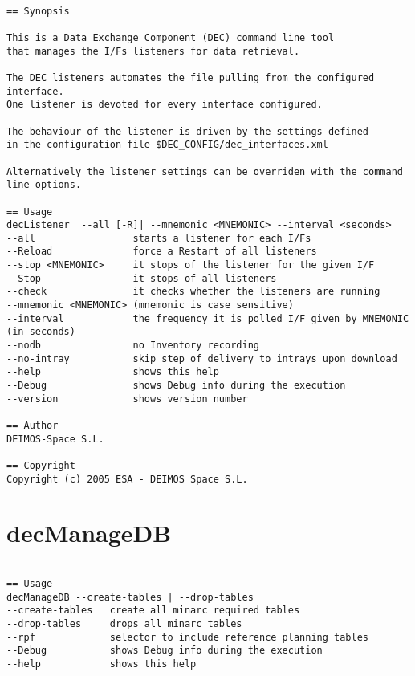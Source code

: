 \documentclass[dec_sum_main.tex]{subfiles}
\begin{document}
\begin{verbatim}

== Synopsis

This is a Data Exchange Component (DEC) command line tool 
that manages the I/Fs listeners for data retrieval.

The DEC listeners automates the file pulling from the configured interface.
One listener is devoted for every interface configured.

The behaviour of the listener is driven by the settings defined
in the configuration file $DEC_CONFIG/dec_interfaces.xml

Alternatively the listener settings can be overriden with the command line options.

== Usage
decListener  --all [-R]| --mnemonic <MNEMONIC> --interval <seconds>
--all                 starts a listener for each I/Fs
--Reload              force a Restart of all listeners
--stop <MNEMONIC>     it stops of the listener for the given I/F
--Stop                it stops of all listeners
--check               it checks whether the listeners are running
--mnemonic <MNEMONIC> (mnemonic is case sensitive)
--interval            the frequency it is polled I/F given by MNEMONIC (in seconds)
--nodb                no Inventory recording
--no-intray           skip step of delivery to intrays upon download
--help                shows this help
--Debug               shows Debug info during the execution
--version             shows version number      

== Author
DEIMOS-Space S.L.

== Copyright
Copyright (c) 2005 ESA - DEIMOS Space S.L.

\end{verbatim}

\label{decManageDB}

\section{decManageDB}

\begin{verbatim}

== Usage
decManageDB --create-tables | --drop-tables
--create-tables   create all minarc required tables
--drop-tables     drops all minarc tables
--rpf             selector to include reference planning tables
--Debug           shows Debug info during the execution
--help            shows this help


\end{verbatim}
\end{document}
